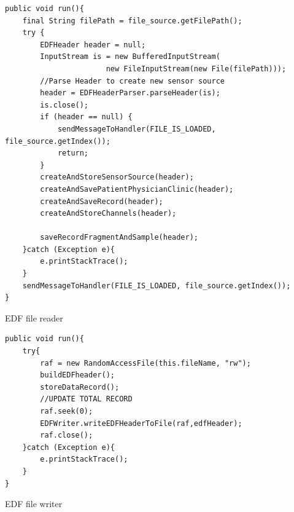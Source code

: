 \begin{code}[ht]
\begin{lstlisting}
public void run(){
    final String filePath = file_source.getFilePath();
    try {
        EDFHeader header = null;
        InputStream is = new BufferedInputStream(
                       new FileInputStream(new File(filePath)));
        //Parse Header to create new sensor source
        header = EDFHeaderParser.parseHeader(is);
        is.close();
        if (header == null) {
            sendMessageToHandler(FILE_IS_LOADED, file_source.getIndex());
            return;
        }
        createAndStoreSensorSource(header);
        createAndSavePatientPhysicianClinic(header);
        createAndSaveRecord(header);
        createAndStoreChannels(header);

        saveRecordFragmentAndSample(header);
    }catch (Exception e){
        e.printStackTrace();
    }
    sendMessageToHandler(FILE_IS_LOADED, file_source.getIndex());
}
\end{lstlisting}
\caption[EDF file reader]{EDF file reader}
\label{listing:EDFREADER}
\end{code}
\begin{code}[ht]
\begin{lstlisting}
public void run(){
    try{
        raf = new RandomAccessFile(this.fileName, "rw");
        buildEDFheader();
        storeDataRecord();
        //UPDATE TOTAL RECORD
        raf.seek(0);
        EDFWriter.writeEDFHeaderToFile(raf,edfHeader);
        raf.close();
    }catch (Exception e){
        e.printStackTrace();
    }
}
\end{lstlisting}
\caption[EDF file writer]{EDF file writer}
\label{listing:EDFWriter}
\end{code}
